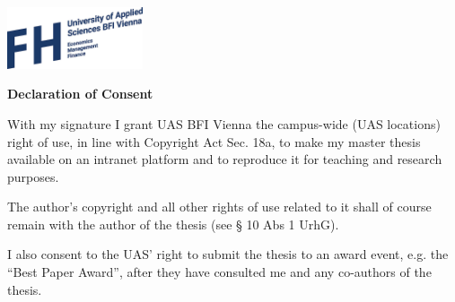 

\begin{flushright}
\includegraphics[width=0.3\textwidth]{figures/FHlogo2.jpeg}\par
\end{flushright}

\vspace{1.5cm}
	
\begin{center}
\fontsize{18}{21.6}\selectfont
\textbf{Declaration of Consent}
\end{center}

\vspace{1cm}

With my signature I grant UAS BFI Vienna the campus-wide (UAS locations) right of use, in line with Copyright Act Sec. 18a, to make my master thesis available on an intranet platform and to reproduce it for teaching and research purposes.

\vspace{0.5cm}

The author’s copyright and all other rights of use related to it shall of course remain with the author of the thesis (see § 10 Abs 1 UrhG).

I also consent to the UAS’ right to submit the thesis to an award event, e.g. the “Best Paper Award”, after they have consulted me and any co-authors of the thesis.

\signature{Place, Date}{}\hfill{}